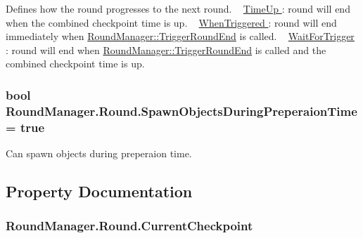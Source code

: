 Defines how the round progresses to the next round. ~\newline
\hyperlink{}{Time\+Up }\+: round will end when the combined checkpoint time is up. ~\newline
\hyperlink{}{When\+Triggered }\+: round will end immediately when \hyperlink{class_round_manager_1_1_trigger_round_end}{Round\+Manager\+::\+Trigger\+Round\+End} is called. ~\newline
\hyperlink{}{Wait\+For\+Trigger }\+: round will end when \hyperlink{class_round_manager_1_1_trigger_round_end}{Round\+Manager\+::\+Trigger\+Round\+End} is called and the combined checkpoint time is up. 

\hypertarget{class_round_manager_1_1_round_a9c32b59e081626bb406a85caeb2a3cf4}{}
\subsubsection[{Spawn\+Objects\+During\+Preperaion\+Time}]{\setlength{\rightskip}{0pt plus 5cm}bool Round\+Manager.\+Round.\+Spawn\+Objects\+During\+Preperaion\+Time = true}\label{class_round_manager_1_1_round_a9c32b59e081626bb406a85caeb2a3cf4}


Can spawn objects during preperaion time. 



\subsection{Property Documentation}
\hypertarget{class_round_manager_1_1_round_af5caa46388278646d34c7255ce52b0be}{}
\subsubsection[{Current\+Checkpoint}]{ Round\+Manager.\+Round.\+Current\+Checkpoint\hspace{0.3cm}{\ttfamily [get]}}\label{class_round_manager_1_1_round_af5caa46388278646d34c7255ce52b0be}


